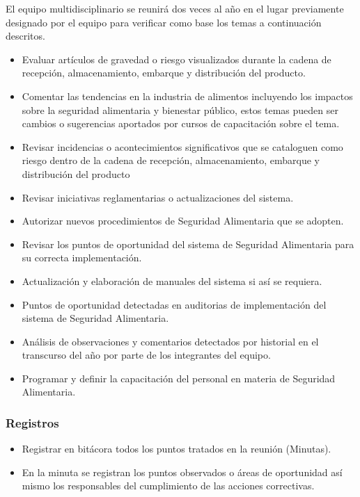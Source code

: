 El equipo multidisciplinario se reunirá dos veces al año en el lugar previamente designado por el equipo para verificar como base los temas a continuación descritos.

\begin{itemize}
	\item Evaluar artículos de gravedad o riesgo visualizados durante la cadena de recepción, almacenamiento, embarque y distribución del producto.
	\item Comentar las tendencias en la industria de alimentos incluyendo los impactos sobre la seguridad alimentaria y bienestar público, estos temas pueden ser cambios o sugerencias aportados por cursos de capacitación sobre el tema.
	\item Revisar incidencias o acontecimientos significativos que se cataloguen como riesgo dentro de la cadena de recepción, almacenamiento, embarque y distribución del producto
	\item Revisar iniciativas reglamentarias o actualizaciones del sistema.
	\item Autorizar nuevos procedimientos de Seguridad Alimentaria que se adopten.
	\item Revisar los puntos de oportunidad del sistema de Seguridad Alimentaria para su correcta implementación.
	\item Actualización y elaboración de manuales del sistema si así se requiera.
	\item Puntos de oportunidad detectadas en auditorias de implementación del sistema de Seguridad Alimentaria.
	\item Análisis de observaciones y comentarios detectados por historial en el transcurso del año por parte de los integrantes del equipo.
	\item Programar y definir la capacitación del personal en materia de Seguridad Alimentaria.
\end{itemize}

\subsubsection{Registros}

\begin{itemize}
	\item Registrar en bitácora todos los puntos tratados en la reunión (Minutas).
	\item En la minuta se registran los puntos observados o áreas de oportunidad así mismo los responsables del cumplimiento de las acciones correctivas.
\end{itemize}


